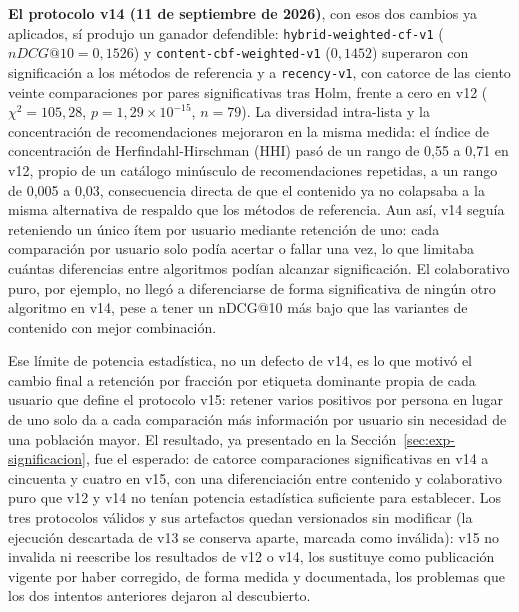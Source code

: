 \textbf{El protocolo v14 (11 de septiembre de 2026)}, con esos dos cambios ya aplicados, sí produjo un
ganador defendible: \texttt{hybrid-weighted-cf-v1} (\(nDCG@10=0{,}1526\)) y
\texttt{content-cbf-weighted-v1} (\(0{,}1452\)) superaron con significación a los métodos de referencia y
a \texttt{recency-v1}, con catorce de las ciento veinte comparaciones por pares significativas
tras Holm, frente a cero en v12 (\(\chi^2=105{,}28\), \(p=1{,}29\times10^{-15}\), \(n=79\)). La
diversidad intra-lista y la concentración de recomendaciones mejoraron en la misma medida: el
índice de concentración de Herfindahl-Hirschman (HHI) pasó de un rango de 0,55 a 0,71 en v12, propio
de un catálogo minúsculo de recomendaciones repetidas, a un rango de 0,005 a 0,03, consecuencia
directa de que el contenido ya no colapsaba a la misma alternativa de respaldo que los métodos de referencia. Aun
así, v14 seguía reteniendo un único ítem por usuario mediante retención de uno: cada
comparación por usuario solo podía acertar o fallar una vez, lo que limitaba cuántas
diferencias entre algoritmos podían alcanzar significación. El colaborativo puro, por ejemplo,
no llegó a diferenciarse de forma significativa de ningún otro algoritmo en v14, pese a tener
un nDCG@10 más bajo que las variantes de contenido con mejor combinación.

Ese límite de potencia estadística, no un defecto de v14, es lo que motivó el cambio final a
retención por fracción por etiqueta dominante propia de cada usuario que define el
protocolo v15: retener varios positivos por persona en lugar de uno solo da a cada comparación
más información por usuario sin necesidad de una población mayor. El resultado, ya presentado
en la Sección~\ref{sec:exp-significacion}, fue el esperado: de catorce comparaciones
significativas en v14 a cincuenta y cuatro en v15, con una diferenciación entre contenido y
colaborativo puro que v12 y v14 no tenían potencia estadística suficiente para establecer.
Los tres protocolos válidos y sus artefactos quedan versionados sin modificar (la ejecución descartada de v13 se
conserva aparte, marcada como inválida): v15 no invalida ni
reescribe los resultados de v12 o v14, los sustituye como publicación vigente por haber
corregido, de forma medida y documentada, los problemas que los dos intentos anteriores dejaron
al descubierto.

